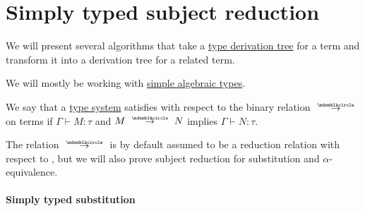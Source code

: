 \section{Simply typed subject reduction}\label{sec:simply_typed_subject_reduction}

We will present several algorithms that take a \hyperref[def:type_derivation_tree]{type derivation tree} for a term and transform it into a derivation tree for a related term.

We will mostly be working with \hyperref[def:simple_algebraic_types]{simple algebraic types}.

\begin{concept}\label{con:subject_reduction}
  We say that a \hyperref[def:abstract_type_system]{type system} satisfies  with respect to the binary relation \( {\pred} \) on terms if \( \Gamma \vdash M: \tau \) and \( M \pred N \) implies \( \Gamma \vdash N: \tau \).
\end{concept}
\begin{comments}
  \item The relation \( {\pred} \) is by default assumed to be a reduction relation with respect to , but we will also prove subject reduction for substitution and \( \alpha \)-equivalence.
\end{comments}

\paragraph{Simply typed substitution}

